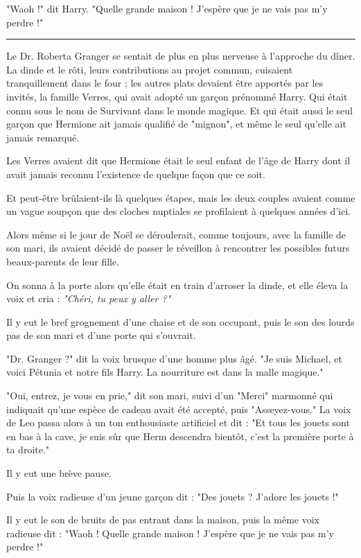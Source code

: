"Waoh !" dit Harry. "Quelle grande maison ! J'espère que je ne vais pas m'y perdre !"
\par\noindent\rule{\textwidth}{0.4pt}
Le Dr. Roberta Granger se sentait de plus en plus nerveuse à l'approche du dîner. La dinde et le rôti, leurs contributions au projet commun, cuisaient tranquillement dans le four ; les autres plats devaient être apportés par les invités, la famille Verres, qui avait adopté un garçon prénommé Harry. Qui était connu sous le nom de Survivant dans le monde magique. Et qui était aussi le seul garçon que Hermione ait jamais qualifié de "mignon", et même le seul qu'elle ait jamais remarqué.

Les Verres avaient dit que Hermione était le seul enfant de l'âge de Harry dont il avait jamais reconnu l'existence de quelque façon que ce soit.

Et peut-être brûlaient-ils là quelques étapes, mais les deux couples avaient comme un vague soupçon que des cloches nuptiales se profilaient à quelques années d'ici.

Alors même si le jour de Noël se déroulerait, comme toujours, avec la famille de son mari, ils avaient décidé de passer le réveillon à rencontrer les possibles futurs beaux-parents de leur fille.

On sonna à la porte alors qu'elle était en train d'arroser la dinde, et elle éleva la voix et cria : \emph{"Chéri, tu peux y aller ?"} 

Il y eut le bref grognement d'une chaise et de son occupant, puis le son des lourds pas de son mari et d'une porte qui s'ouvrait.

"Dr. Granger ?" dit la voix brusque d'une homme plus âgé. "Je suis Michael, et voici Pétunia et notre fils Harry. La nourriture est dans la malle magique."

"Oui, entrez, je vous en prie," dit son mari, suivi d'un "Merci" marmonné qui indiquait qu'une espèce de cadeau avait été accepté, puis "Asseyez-vous." La voix de Leo passa alors à un ton enthousiaste artificiel et dit : "Et tous les jouets sont en bas à la cave, je suis sûr que Herm descendra bientôt, c'est la première porte à ta droite."

Il y eut une brève pause.

Puis la voix radieuse d'un jeune garçon dit : "Des jouets ? J'adore les jouets !"

Il y eut le son de bruits de pas entrant dans la maison, puis la même voix radieuse dit : "Waoh ! Quelle grande maison ! J'espère que je ne vais pas m'y perdre !"

